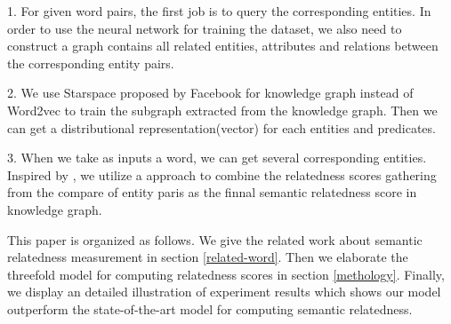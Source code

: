 1. For given word pairs, the first job is to query the corresponding entities. In order to use the
neural network for training the dataset, we also need to construct a graph contains all related
entities, attributes and relations between the corresponding entity pairs.

2. We use Starspace proposed by Facebook for knowledge graph instead of Word2vec to train the subgraph
extracted from the knowledge graph. Then we can get a distributional representation(vector) for each
entities and predicates. 

3. When we take as inputs a word, we can get several corresponding entities.
Inspired by \cite{acl/IacobacciPN15}, we utilize a approach to combine the 
relatedness scores gathering from the compare of entity paris
as the finnal semantic relatedness score in knowledge graph.

This paper is organized as follows. We give the related work about semantic relatedness
measurement in section \ref{related-word}. Then we elaborate the threefold model for
computing relatedness scores in section \ref{methology}. Finally, we display an detailed
illustration of experiment results which shows our model outperform the state-of-the-art model
for computing semantic relatedness.